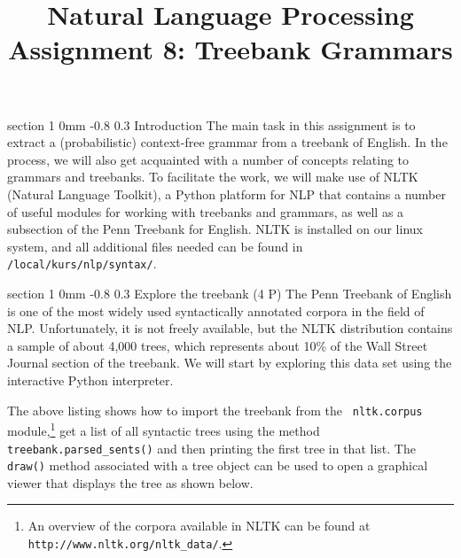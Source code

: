 \documentclass[11pt]{article}
\title{{\LARGE Natural Language Processing}\\[1.5mm]{\large Assignment 8: Treebank Grammars}}
\author{}
\date{} %
\makeatletter
\newcommand{\newsec}[2]{\section{#1}\label{sec:#2}\noindent}
\renewcommand{\section}{\@startsection
{section}%
{1}%
{0mm}%
{-0.8\baselineskip}%
{0.3\baselineskip}%
{\bfseries\large}}%
\makeatother
\begin{document}
 

\maketitle
\vspace{-2mm} \newsec{Introduction}{intro}%
The main task in this assignment is to extract a (probabilistic)
context-free grammar from a treebank of English. In the process, we
will also get acquainted with a number of concepts relating to
grammars and treebanks. To facilitate the work, we will make use of
NLTK (Natural Language Toolkit), a Python platform for NLP that
contains a number of useful modules for working with treebanks and
grammars, as well as a subsection of the Penn Treebank for
English. NLTK is installed on our linux system, and all additional
files needed can be found in {\tt /local/kurs/nlp/syntax/}.

\newsec{Explore the treebank (4 P)}{data}%
The Penn Treebank of English is one of the most widely used
syntactically annotated corpora in the field of NLP. Unfortunately, it
is not freely available, but the NLTK distribution contains a sample
of about 4,000 trees, which represents about 10\% of the Wall Street
Journal section of the treebank. We will start by exploring this data
set using the interactive Python interpreter.

\begin{center}
\fbox{

}
\end{center}
The above listing shows how to import the treebank from the {\tt
  nltk.corpus} module,\footnote{An overview of the corpora available
  in NLTK can be found at {\tt http://www.nltk.org/nltk\_data/}.}  get
a list of all syntactic trees using the method {\tt
  treebank.parsed\_sents()} and then printing the first tree in that
list. The {\tt draw()} method associated with a tree object can be
used to open a graphical viewer that displays the tree as shown below.
\end{document}
